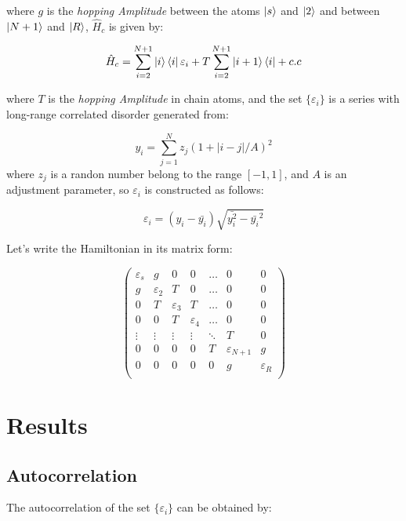 \documentclass{comjnl}
\begin{document}
\noindent where $g$ is the \textit{hopping Amplitude} between the atoms $\ket{s}$ and $\ket{2}$ and between $\ket{N+1}$ and $\ket{R}$, $\hat{H}_c$ is given by:

\begin{equation}
    \hat{H}_c = \sum_{i=2}^{N+1} \ket{i}\bra{i}\varepsilon_i + T \sum_{i=2}^{N+1}  \ket{i+1}\bra{i} + c.c
\end{equation}

\noindent where $T$ is the \textit{hopping Amplitude} in chain atoms, and the set $\{\varepsilon_i\}$ is a series with long-range correlated disorder generated from:

\begin{equation}\label{lorentzian}
    y_i = \sum_{j=1}^N z_j(1+|i-j|/A)^2
\end{equation}
where $z_j$ is a randon number belong to the range $[-1,1]$, and $A$ is an adjustment parameter, so $\varepsilon_i$ is constructed as follows:

\begin{equation}
    \varepsilon_i =(y_i - \bar{y_i})\sqrt{\bar{y_i^2} - \bar{y_i}^2}
\end{equation}

\noindent Let's write the Hamiltonian in its matrix form:

\begin{equation}
\begin{pmatrix}
    \varepsilon_s  & g & 0 & 0 & \dots & 0 & 0\\
    g & \varepsilon_2  & T & 0 & \dots & 0 & 0\\
    0 & T & \varepsilon_3  & T & \dots & 0 & 0\\
    0 & 0 & T & \varepsilon_4 & \dots  & 0 & 0\\
    \vdots & \vdots & \vdots  & \vdots & \ddots & T & 0\\
    0 & 0 & 0 & 0 & T & \varepsilon_{N+1} & g\\
    0 & 0 & 0 & 0 & 0 & g & \varepsilon_R\\
\end{pmatrix}
\end{equation}

\section{Results}  
\subsection{Autocorrelation}
The autocorrelation of the set $\{\varepsilon_i\}$ can be obtained by:
\end{document}

